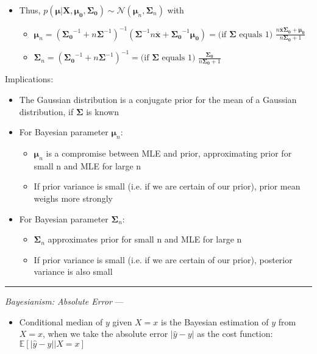 \begin{itemize}
    \item Thus, $p(\boldsymbol{\mu} | \boldsymbol{X}, \boldsymbol{\mu_0}, \boldsymbol{\Sigma_0}) \sim \mathcal{N}(\boldsymbol{\mu}_n, \boldsymbol{\Sigma}_n)$ with
    \begin{itemize}
        \item $\boldsymbol{\mu}_n = (\boldsymbol{\Sigma_0}^{-1} + n \boldsymbol{\Sigma}^{-1})^{-1} (\boldsymbol{\Sigma}^{-1} n \overline{\boldsymbol{x}} + \boldsymbol{\Sigma_0}^{-1} \boldsymbol{\mu_0}) = \textrm{(if } \boldsymbol{\Sigma} \textrm{ equals 1) } \frac{n \overline{\boldsymbol{x}} \boldsymbol{\Sigma_0} + \boldsymbol{\mu_0}}{n \boldsymbol{\Sigma_0} + 1}$
        \item $\boldsymbol{\Sigma}_n = (\boldsymbol{\Sigma_0}^{-1} + n \boldsymbol{\Sigma}^{-1})^{-1} = \textrm{(if } \boldsymbol{\Sigma} \textrm{ equals 1) } \frac{\boldsymbol{\Sigma_0}}{n \boldsymbol{\Sigma_0} + 1}$
    \end{itemize}
\end{itemize}
Implications:
\begin{itemize}
    \item The Gaussian distribution is a conjugate prior for the mean of a Gaussian distribution, if $\boldsymbol{\Sigma}$ is known
    \item For Bayesian parameter $\boldsymbol{\mu}_n$: 
    \begin{itemize}
        \item $\boldsymbol{\mu}_n$ is a compromise between MLE and prior, approximating prior for small n and MLE for large n
        \item If prior variance is small (i.e. if we are certain of our prior), prior mean weighs more strongly
    \end{itemize}
    \item For Bayesian parameter $\boldsymbol{\Sigma}_n$: \begin{itemize}
        \item $\boldsymbol{\Sigma}_n$ approximates prior for small n and MLE for large n
        \item If prior variance is small (i.e. if we are certain of our prior), posterior variance is also small
    \end{itemize}
\end{itemize}

{\color{lightgray}\hrule height 0.001mm}

\emph{Bayesianism: Absolute Error} --- 
\begin{itemize}
    \item Conditional median of $y$ given $X = x$ is the Bayesian estimation of $y$ from $X = x$, when we take the absolute error $|\hat{y}-y|$ as the cost function: $\mathbb{E}[|\hat{y}-y| | X = x]$
\end{itemize}

